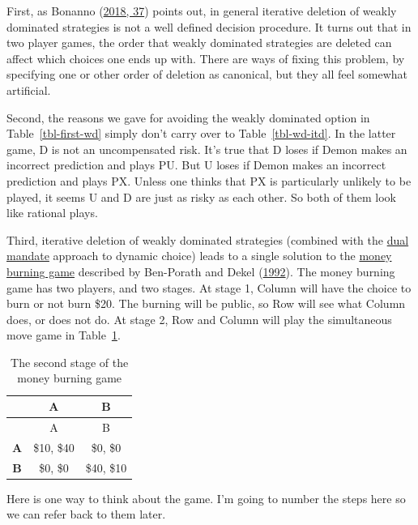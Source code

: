 \documentclass[
  12pt,
  letterpaper,
  DIV=11,
  numbers=noendperiod]{scrreprt}
\begin{document}
First, as Bonanno (\protect\hyperlink{ref-Bonanno2018}{2018, 37}) points
out, in general iterative deletion of weakly dominated strategies is not
a well defined decision procedure. It turns out that in two player
games, the order that weakly dominated strategies are deleted can affect
which choices one ends up with. There are ways of fixing this problem,
by specifying one or other order of deletion as canonical, but they all
feel somewhat artificial.

Second, the reasons we gave for avoiding the weakly dominated option in
Table~\ref{tbl-first-wd} simply don't carry over to
Table~\ref{tbl-wd-itd}. In the latter game, D is not an uncompensated
risk. It's true that D loses if Demon makes an incorrect prediction and
plays PU. But U loses if Demon makes an incorrect prediction and plays
PX. Unless one thinks that PX is particularly unlikely to be played, it
seems U and D are just as risky as each other. So both of them look like
rational plays.

Third, iterative deletion of weakly dominated strategies (combined with
the \protect\hyperlink{sec-dual}{dual mandate} approach to dynamic
choice) leads to a single solution to the
\protect\hyperlink{tbl-money-burning}{money burning game} described by
Ben-Porath and Dekel (\protect\hyperlink{ref-BenPorathDekel1992}{1992}).
The money burning game has two players, and two stages. At stage 1,
Column will have the choice to burn or not burn \$20. The burning will
be public, so Row will see what Column does, or does not do. At stage 2,
Row and Column will play the simultaneous move game in
Table~\ref{tbl-money-burning-part-two}.

\hypertarget{tbl-money-burning-part-two}{}
\begin{longtable}[]{@{}ccc@{}}
\caption{\label{tbl-money-burning-part-two}The second stage of the money
burning game}\tabularnewline
\toprule\noalign{}
& A & B \\
\midrule\noalign{}
\endfirsthead
\toprule\noalign{}
& A & B \\
\midrule\noalign{}
\endhead
\bottomrule\noalign{}
\endlastfoot
\textbf{A} & \$10, \$40 & \$0, \$0 \\
\textbf{B} & \$0, \$0 & \$40, \$10 \\
\end{longtable}

Here is one way to think about the game. I'm going to number the steps
here so we can refer back to them later.
\end{document}
